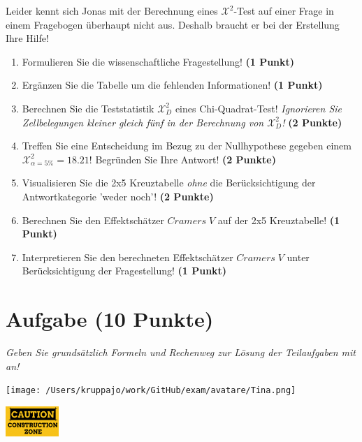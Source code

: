 \documentclass[a4paper, 9pt]{scrartcl}\usepackage[]{graphicx}\usepackage[]{xcolor}
\begin{document}
Leider kennt sich Jonas mit der Berechnung eines $\mathcal{X}^2$-Test auf einer Frage in einem Fragebogen überhaupt nicht aus. Deshalb braucht er bei der Erstellung Ihre Hilfe!

\begin{enumerate}
\item Formulieren Sie die wissenschaftliche Fragestellung! \textbf{(1 Punkt)}
\item Ergänzen Sie die Tabelle um die fehlenden Informationen! \textbf{(1 Punkt)} 
\item Berechnen Sie die Teststatistik $\mathcal{X}^2_{D}$ eines Chi-Quadrat-Test! \textit{Ignorieren Sie Zellbelegungen kleiner gleich fünf in der Berechnung von $\mathcal{X}^2_{D}$!} \textbf{(2 Punkte)}
\item Treffen Sie eine Entscheidung im Bezug zu der Nullhypothese gegeben
  einem $\mathcal{X}^2_{\alpha = 5\%} = 18.21$! Begründen Sie Ihre Antwort!
  \textbf{(2 Punkte)}
\item Visualisieren Sie die 2x5 Kreuztabelle \textit{ohne} die Berücksichtigung der Antwortkategorie 'weder noch'! \textbf{(2 Punkte)}
\item Berechnen Sie den Effektschätzer $Cramers\; V$ auf der 2x5 Kreuztabelle! \textbf{(1 Punkt)}
\item Interpretieren Sie den berechneten Effektschätzer $Cramers\; V$ unter Berücksichtigung der Fragestellung! \textbf{(1 Punkt)}
\end{enumerate} 
\clearpage

\section{Aufgabe \hfill (10 Punkte)}

\textit{Geben Sie grundsätzlich Formeln und Rechenweg zur Lösung der Teilaufgaben mit an!} \\[1Ex]
 

 
\begin{minipage}[t]{0.5\textwidth}
\texttt{[image: /Users/kruppajo/work/GitHub/exam/avatare/Tina.png]}
\end{minipage}
\begin{minipage}[t]{0.5\textwidth}
\hfill
\href{https://youtu.be/-Kva5wc5Elw}{\includegraphics[width = 2cm]{img/caution}}
\end{minipage}
\vspace{-3Ex}
\end{document}
